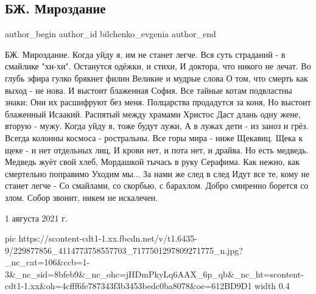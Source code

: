  
 
 
 
 
 
\subsection{БЖ. Мироздание}
\label{sec:02_08_2021.fb.bilchenko_evgenia.1.mirozdanie}
 
\ifcmt
 author_begin
   author_id bilchenko_evgenia
 author_end
\fi

\begin{multicols}{2}
\obeycr
БЖ. Мироздание.
\smallskip
Когда уйду я, им не станет легче.
Вся суть страданий - в смайлике "хи-хи".
Останутся одёжки, и стихи,
И доктора, что никого не лечат.
\smallskip
Во глубь эфира гулко брякнет филин
Великие и мудрые слова
О том, что смерть как выход - не нова.
И выстоит блаженная София.
\smallskip
Все тайные котам подвластны знаки:
Они их расшифруют без меня.
Полцарства продадутся за коня,
Но выстоит блаженный Исаакий.
\smallskip
Распятый между храмами Христос
Даст длань одну жене, вторую - мужу.
Когда уйду я, тоже будут лужи,
А в лужах дети - из заноз и грёз.
\smallskip
Всегда колонны космоса - ростральны.
Все горы мира - ниже Щекавиц.
Щека к щеке - и нет отдельных лиц,
И крови нет, и пота нет, и драйва.
\smallskip
Но есть медведь. Медведь жуёт свой хлеб,
Мордашкой тычась в руку Серафима.
Как нежно, как смертельно поправимо
Уходим мы... За нами же след в след
Идут все те, кому не станет легче -
Со смайлами, со скорбью, с барахлом.
\smallskip
Добро смиренно борется со злом.
Собор звонит, никем не искалечен.
\restorecr
\end{multicols}

1 августа 2021 г.

\ifcmt
  pic https://scontent-cdt1-1.xx.fbcdn.net/v/t1.6435-9/229877856_4114773758557703_7177501297809271775_n.jpg?_nc_cat=106&ccb=1-3&_nc_sid=8bfeb9&_nc_ohc=jHDmPkyLq6AAX_6p_qb&_nc_ht=scontent-cdt1-1.xx&oh=4cfff6fe787343f3b3453bedc0ba8078&oe=612BD9D1
  width 0.4
\fi

